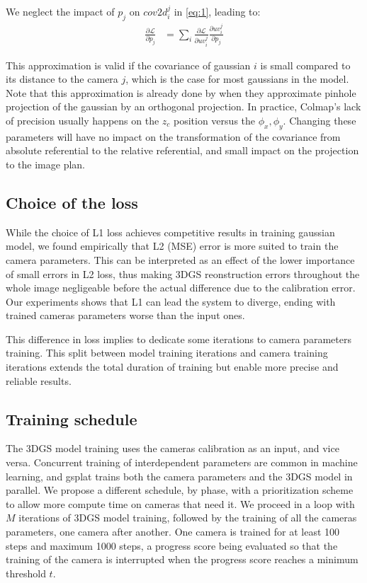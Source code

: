 \documentclass[a4paper,twoside,french]{article}
\begin{document}
We neglect the impact of $p_j$ on $cov2d_i^j$ in \eqref{eq:1}, leading to:
\begin{align}
	\label{eq:2}
	\frac{\partial \mathcal{L}}{\partial p_j} &= \sum_{i} \frac{\partial \mathcal{L}}{\partial uv_i^j} \frac{\partial uv_i^j}{\partial p_j}
\end{align}

This approximation is valid if the covariance of gaussian $i$ is small compared to its distance to the camera $j$,
which is the case for most gaussians in the model. Note that this approximation is already done by \cite{kerbl20233d}
when they approximate pinhole projection of the gaussian by an orthogonal projection.
In practice, Colmap's lack of precision usually happens on the $z_c$ position versus the $\phi_x,\phi_y$.
Changing these parameters will have no impact on the transformation of the covariance from absolute referential
to the relative referential, and small impact on the projection to the image plan.

\subsection{Choice of the loss} \label{L2}
While the choice of L1 loss achieves competitive results in training gaussian model, we found empirically that L2 (MSE) error is more
suited to train the camera parameters. This can be interpreted as an effect of the lower importance of small
errors in L2 loss, thus making 3DGS reonstruction errors throughout the whole image negligeable before the actual
difference due to the calibration error.
Our experiments shows that L1 can lead the system to diverge, ending with trained cameras parameters worse than
the input ones.

This difference in loss implies to dedicate some iterations to camera parameters training. This split between
model training iterations and camera training iterations extends the total duration of training but enable
more precise and reliable results.

\subsection{Training schedule} \label{schedule}
The 3DGS model training uses the cameras calibration as an input, and vice versa. Concurrent training of interdependent
parameters are common in machine learning, and gsplat \cite{ye2024gsplat} trains both the camera parameters and the 3DGS
model in parallel.
We propose a different schedule, by phase, with a prioritization scheme to allow more compute time on cameras that need it.
We proceed in a loop with $M$ iterations of 3DGS model training, followed by the training of all the cameras parameters, one camera
after another. One camera is trained for at least 100 steps and maximum 1000 steps, a progress score being evaluated so that the training of the
camera is interrupted when the progress score reaches a minimum threshold $t$.
\end{document}

